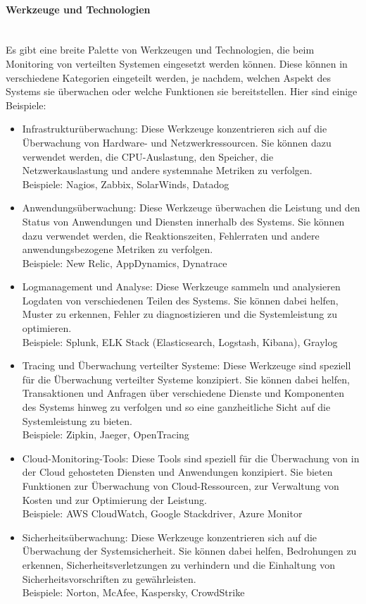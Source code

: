 \paragraph{Werkzeuge und Technologien\\\\}
Es gibt eine breite Palette von Werkzeugen und Technologien, die beim Monitoring von verteilten Systemen eingesetzt werden können. Diese können in verschiedene Kategorien eingeteilt werden, je nachdem, welchen Aspekt des Systems sie überwachen oder welche Funktionen sie bereitstellen. Hier sind einige Beispiele:
\begin{itemize}
\item Infrastrukturüberwachung: Diese Werkzeuge konzentrieren sich auf die Überwachung von Hardware- und Netzwerkressourcen. Sie können dazu verwendet werden, die CPU-Auslastung, den Speicher, die Netzwerkauslastung und andere systemnahe Metriken zu verfolgen.\\
Beispiele: Nagios, Zabbix, SolarWinds, Datadog
\item Anwendungsüberwachung: Diese Werkzeuge überwachen die Leistung und den Status von Anwendungen und Diensten innerhalb des Systems. Sie können dazu verwendet werden, die Reaktionszeiten, Fehlerraten und andere anwendungsbezogene Metriken zu verfolgen.\\
Beispiele: New Relic, AppDynamics, Dynatrace
\item Logmanagement und Analyse: Diese Werkzeuge sammeln und analysieren Logdaten von verschiedenen Teilen des Systems. Sie können dabei helfen, Muster zu erkennen, Fehler zu diagnostizieren und die Systemleistung zu optimieren.\\
Beispiele: Splunk, ELK Stack (Elasticsearch, Logstash, Kibana), Graylog
\item Tracing und Überwachung verteilter Systeme: Diese Werkzeuge sind speziell für die Überwachung verteilter Systeme konzipiert. Sie können dabei helfen, Transaktionen und Anfragen über verschiedene Dienste und Komponenten des Systems hinweg zu verfolgen und so eine ganzheitliche Sicht auf die Systemleistung zu bieten.\\
Beispiele: Zipkin, Jaeger, OpenTracing
\item Cloud-Monitoring-Tools: Diese Tools sind speziell für die Überwachung von in der Cloud gehosteten Diensten und Anwendungen konzipiert. Sie bieten Funktionen zur Überwachung von Cloud-Ressourcen, zur Verwaltung von Kosten und zur Optimierung der Leistung.\\
Beispiele: AWS CloudWatch, Google Stackdriver, Azure Monitor
\item Sicherheitsüberwachung: Diese Werkzeuge konzentrieren sich auf die Überwachung der Systemsicherheit. Sie können dabei helfen, Bedrohungen zu erkennen, Sicherheitsverletzungen zu verhindern und die Einhaltung von Sicherheitsvorschriften zu gewährleisten.\\
Beispiele: Norton, McAfee, Kaspersky, CrowdStrike
\end{itemize}
